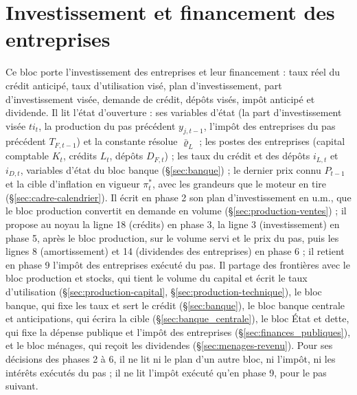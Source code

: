 \documentclass[11pt,a4paper]{article}
\begin{document}
\section{Investissement et financement des entreprises}
\label{sec:investissement}
Ce bloc porte l'investissement des entreprises et leur financement : taux réel du crédit anticipé, taux d'utilisation visé, plan d'investissement, part d'investissement visée, demande de crédit, dépôts visés, impôt anticipé et dividende. Il lit l'état d'ouverture : ses variables d'état (la part d'investissement visée $\mathit{ti}_t$, la production du pas précédent $y_{j,t-1}$, l'impôt des entreprises du pas précédent $T_{F,t-1}$) et la constante résolue $\bar\varrho_L$ ; les postes des entreprises (capital comptable $K_t$, crédits $L_t$, dépôts $D_{F,t}$) ; les taux du crédit et des dépôts $i_{L,t}$ et $i_{D,t}$, variables d'état du bloc banque (\S\ref{sec:banque}) ; le dernier prix connu $P_{t-1}$ et la cible d'inflation en vigueur $\pi^\ast_t$, avec les grandeurs que le moteur en tire (\S\ref{sec:cadre-calendrier}). Il écrit en phase 2 son plan d'investissement en u.m., que le bloc production convertit en demande en volume (\S\ref{sec:production-ventes}) ; il propose au noyau la ligne 18 (crédits) en phase 3, la ligne 3 (investissement) en phase 5, après le bloc production, sur le volume servi et le prix du pas, puis les lignes 8 (amortissement) et 14 (dividendes des entreprises) en phase 6 ; il retient en phase 9 l'impôt des entreprises exécuté du pas. Il partage des frontières avec le bloc production et stocks, qui tient le volume du capital et écrit le taux d'utilisation (\S\ref{sec:production-capital}, \S\ref{sec:production-technique}), le bloc banque, qui fixe les taux et sert le crédit (\S\ref{sec:banque}), le bloc banque centrale et anticipations, qui écrira la cible (\S\ref{sec:banque_centrale}), le bloc État et dette, qui fixe la dépense publique et l'impôt des entreprises (\S\ref{sec:finances_publiques}), et le bloc ménages, qui reçoit les dividendes (\S\ref{sec:menages-revenu}). Pour ses décisions des phases 2 à 6, il ne lit ni le plan d'un autre bloc, ni l'impôt, ni les intérêts exécutés du pas ; il ne lit l'impôt exécuté qu'en phase 9, pour le pas suivant.
\end{document}
